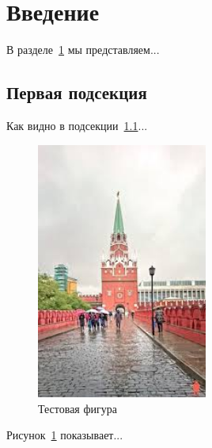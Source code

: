 \documentclass{article}
\begin{document}
\section{Введение}
\label{sec:intro}

В разделе~\ref{sec:intro} мы представляем...

\subsection{Первая подсекция}
\label{subsec:first}

Как видно в подсекции~\ref{subsec:first}...

\begin{figure}[ht]
    \centering
    \includegraphics[width=0.5\textwidth]{image}
    \caption{Тестовая фигура}
    \label{fig:test}
\end{figure}

Рисунок~\ref{fig:test} показывает...
\end{document}
